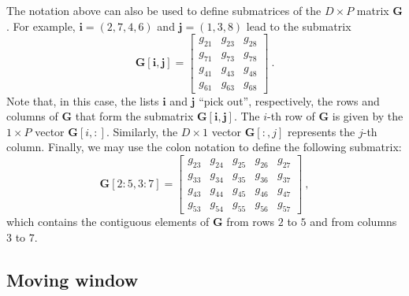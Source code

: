 The notation above can also be used to define submatrices of the $D \times P$ matrix $\mathbf{G}$. 
For example, $\mathbf{i} = (2, 7, 4, 6)$ and $\mathbf{j} = (1, 3, 8)$ lead to the submatrix
\begin{equation*}
	\mathbf{G}[\mathbf{i}, \mathbf{j}] = \begin{bmatrix}
		g_{21} & g_{23} & g_{28} \\
		g_{71} & g_{73} & g_{78} \\
		g_{41} & g_{43} & g_{48} \\
		g_{61} & g_{63} & g_{68} 
	\end{bmatrix} \: .
\end{equation*}
Note that, in this case, the lists $\mathbf{i}$ and $\mathbf{j}$ ``pick out'', respectively, the rows and columns
of $\mathbf{G}$ that form the submatrix $\mathbf{G}[\mathbf{i}, \mathbf{j}]$.
The $i$-th row of $\mathbf{G}$ is given by the $1 \times P$ vector $\mathbf{G}[i,:]$.
Similarly, the $D \times 1$ vector $\mathbf{G}[:,j]$ represents the $j$-th column.
Finally, we may use the colon notation to define the following submatrix:
\begin{equation*}
	\mathbf{G}[2:5,3:7] = \begin{bmatrix}
		g_{23} & g_{24} & g_{25} & g_{26} & g_{27} \\
		g_{33} & g_{34} & g_{35} & g_{36} & g_{37} \\
		g_{43} & g_{44} & g_{45} & g_{46} & g_{47} \\
		g_{53} & g_{54} & g_{55} & g_{56} & g_{57}
	\end{bmatrix} \: ,
\end{equation*}
which contains the contiguous elements of $\mathbf{G}$ from rows $2$ to $5$ and from columns
$3$ to $7$.

\subsection{Moving window}

